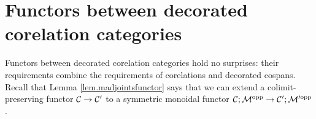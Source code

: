 
\section{Functors between decorated corelation categories}
Functors between decorated corelation categories hold no surprises: their
requirements combine the requirements of corelations and decorated cospans.
Recall that Lemma \ref{lem.madjointsfunctor} says that we can extend a
colimit-preserving functor $\mathcal C \to \mathcal C'$ to a symmetric monoidal functor
$\mathcal C;\mathcal M^{\mathrm{opp}} \to \mathcal C';\mathcal M'^{\mathrm{opp}}$.

